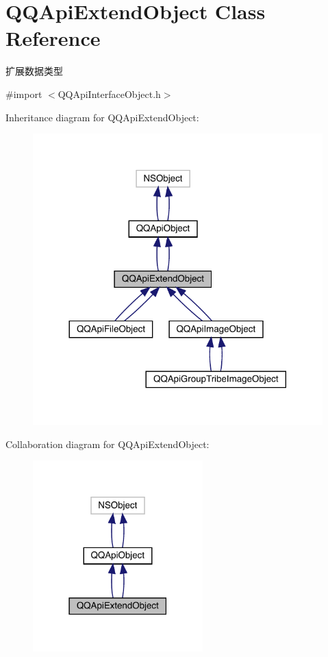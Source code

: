 \hypertarget{interface_q_q_api_extend_object}{}\section{Q\+Q\+Api\+Extend\+Object Class Reference}
\label{interface_q_q_api_extend_object}


扩展数据类型  




{\ttfamily \#import $<$Q\+Q\+Api\+Interface\+Object.\+h$>$}



Inheritance diagram for Q\+Q\+Api\+Extend\+Object\+:\nopagebreak
\begin{figure}[H]
\begin{center}
\leavevmode
\includegraphics[width=317pt]{interface_q_q_api_extend_object__inherit__graph}
\end{center}
\end{figure}


Collaboration diagram for Q\+Q\+Api\+Extend\+Object\+:\nopagebreak
\begin{figure}[H]
\begin{center}
\leavevmode
\includegraphics[width=186pt]{interface_q_q_api_extend_object__coll__graph}
\end{center}
\end{figure}
